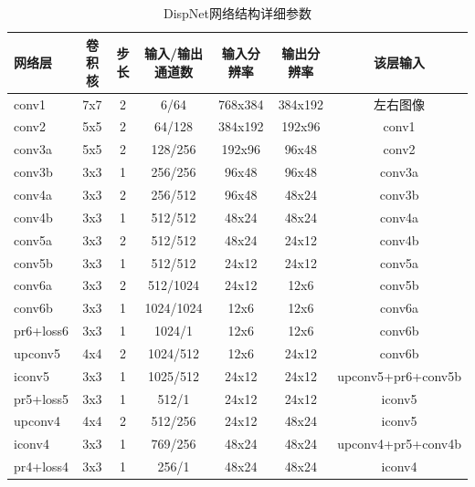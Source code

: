 \begin{table}[htbp] %
	\centering
	\caption{DispNet网络结构详细参数}
	\label{tab:4_1_DispNet_architecture}
	\begin{scriptsize}   %
		\begin{tabular}{|l|c c c|c c|c|}\hline
			网络层 & 卷积核 & 步长 & 输入/输出通道数 & 输入分辨率 & 输出分辨率 & 该层输入 \\\hline
			conv1    & 7x7 & 2 & 6/64                & 768x384 & 384x192 & 左右图像 \\
			conv2    & 5x5 & 2 & 64/128           & 384x192  & 192x96    & conv1 \\
			conv3a & 5x5 & 2 & 128/256         & 192x96     & 96x48      & conv2 \\
			conv3b & 3x3 & 1 & 256/256        & 96x48       & 96x48      & conv3a\\
			conv4a & 3x3 & 2 & 256/512        & 96x48        & 48x24      & conv3b \\
			conv4b & 3x3 & 1 & 512/512         & 48x24        & 48x24       & conv4a \\
			conv5a & 3x3 & 2 & 512/512         & 48x24        & 24x12        & conv4b \\
			conv5b & 3x3 & 1 & 512/512         & 24x12          & 24x12       & conv5a \\
			conv6a & 3x3 & 2 & 512/1024     & 24x12          & 12x6          & conv5b \\
			conv6b & 3x3 & 1 & 1024/1024  & 12x6             & 12x6          & conv6a \\\hline
			pr6+loss6 & 3x3 & 1 & 1024/1 & 12x6 & 12x6 & conv6b \\\hline
			upconv5    & 4x4 & 2 & 1024/512  & 12x6        & 24x12    & conv6b \\
			iconv5        & 3x3 & 1 & 1025/512  & 24x12      & 24x12    & upconv5+pr6+conv5b \\
			pr5+loss5  & 3x3 & 1 & 512/1         & 24x12      & 24x12    & iconv5 \\
			upconv4    & 4x4 & 2 & 512/256   & 24x12      & 48x24    & iconv5 \\
			iconv4        & 3x3 & 1 & 769/256  & 48x24     & 48x24    & upconv4+pr5+conv4b \\
			pr4+loss4 & 3x3 & 1  & 256/1       & 48x24     & 48x24    & iconv4 \\

\end{tabular}
\end{scriptsize}
\end{table}
